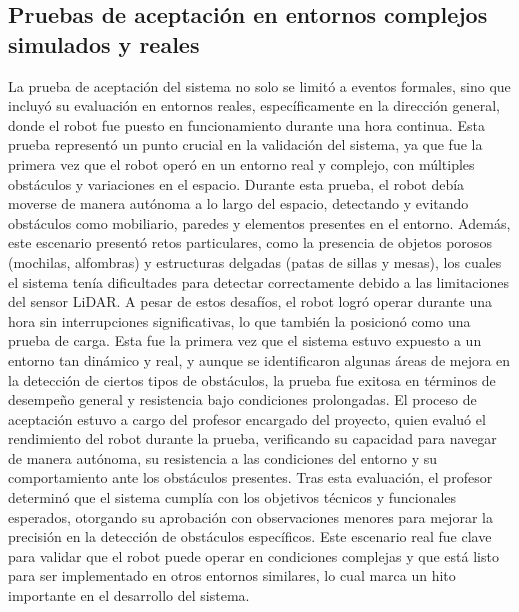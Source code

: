 \subsection{Pruebas de aceptaci\'on en entornos complejos simulados y reales}

    La prueba de aceptaci\'on del sistema no solo se limit\'o a eventos formales, 
        sino que incluy\'o su evaluaci\'on en entornos reales, espec\'ificamente en 
        la direcci\'on general, donde el robot fue puesto en funcionamiento durante 
        una hora continua. Esta prueba represent\'o un punto crucial en la validaci\'on 
        del sistema, ya que fue la primera vez que el robot oper\'o en un entorno real 
        y complejo, con m\'ultiples obst\'aculos y variaciones en el espacio.
    \vskip 0.5cm
    Durante esta prueba, el robot deb\'ia moverse de manera aut\'onoma a lo largo del espacio, 
        detectando y evitando obst\'aculos como mobiliario, paredes y elementos presentes en 
        el entorno. Adem\'as, este escenario present\'o retos particulares, como la presencia 
        de objetos porosos (mochilas, alfombras) y estructuras delgadas (patas de sillas y mesas), 
        los cuales el sistema ten\'ia dificultades para detectar correctamente debido a las 
        limitaciones del sensor LiDAR.
    \vskip 0.5cm
    A pesar de estos desaf\'ios, el robot logr\'o operar durante una hora sin interrupciones 
        significativas, lo que tambi\'en la posicion\'o como una prueba de carga. Esta fue 
        la primera vez que el sistema estuvo expuesto a un entorno tan din\'amico y real, 
        y aunque se identificaron algunas \'areas de mejora en la detecci\'on de ciertos tipos 
        de obst\'aculos, la prueba fue exitosa en t\'erminos de desempe\~no general y resistencia 
        bajo condiciones prolongadas.
    \vskip 0.5cm
    El proceso de aceptaci\'on estuvo a cargo del profesor encargado del proyecto, quien evalu\'o el 
        rendimiento del robot durante la prueba, verificando su capacidad para navegar de manera 
        aut\'onoma, su resistencia a las condiciones del entorno y su comportamiento ante los obst\'aculos 
        presentes. Tras esta evaluaci\'on, el profesor determin\'o que el sistema cumpl\'ia con los objetivos 
        t\'ecnicos y funcionales esperados, otorgando su aprobaci\'on con observaciones menores para mejorar 
        la precisi\'on en la detecci\'on de obst\'aculos espec\'ificos.
    \vskip 0.5cm
    Este escenario real fue clave para validar que el robot puede operar en condiciones complejas y que est\'a 
        listo para ser implementado en otros entornos similares, lo cual marca un hito importante en el 
        desarrollo del sistema.